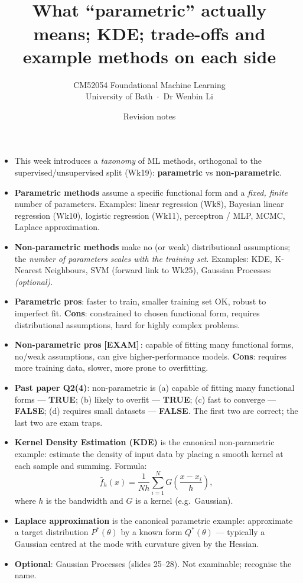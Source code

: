 \documentclass[11pt, a4paper]{article}
\title{\vspace{-1cm}{\Huge\bfseries Week 20 — Parametric \& Non-parametric Approximations} \\[0.4em]{\large What ``parametric'' actually means; KDE; trade-offs and example methods on each side}}
\author{\large CM52054 Foundational Machine Learning \\[0.2em]\normalsize University of Bath \,$\cdot$\, Dr Wenbin Li}
\date{Revision notes}
\newcommand{\examflag}{\textcolor{tipBd}{\textbf{[EXAM]}}\,}
\begin{document}
\maketitle\thispagestyle{empty}\vspace{1em}

\begin{tldrbox}
\begin{itemize}[leftmargin=*]
  \item This week introduces a \emph{taxonomy} of ML methods, orthogonal to the supervised/unsupervised split (Wk19): \textbf{parametric} vs \textbf{non-parametric}.
  \item \textbf{Parametric methods} assume a specific functional form and a \emph{fixed, finite} number of parameters. Examples: linear regression (Wk8), Bayesian linear regression (Wk10), logistic regression (Wk11), perceptron / MLP, MCMC, Laplace approximation.
  \item \textbf{Non-parametric methods} make no (or weak) distributional assumptions; the \emph{number of parameters scales with the training set}. Examples: KDE, K-Nearest Neighbours, SVM (forward link to Wk25), Gaussian Processes \emph{(optional)}.
  \item \textbf{Parametric pros}: faster to train, smaller training set OK, robust to imperfect fit. \textbf{Cons}: constrained to chosen functional form, requires distributional assumptions, hard for highly complex problems.
  \item \textbf{Non-parametric pros} \examflag{}: capable of fitting many functional forms, no/weak assumptions, can give higher-performance models. \textbf{Cons}: requires more training data, slower, more prone to overfitting.
  \item \textbf{Past paper Q2(4)}: non-parametric is (a) capable of fitting many functional forms — \textbf{TRUE}; (b) likely to overfit — \textbf{TRUE}; (c) fast to converge — \textbf{FALSE}; (d) requires small datasets — \textbf{FALSE}. The first two are correct; the last two are exam traps.
  \item \textbf{Kernel Density Estimation (KDE)} is the canonical non-parametric example: estimate the density of input data by placing a smooth kernel at each sample and summing. Formula:
  \[
  \bar f_h(x) = \frac{1}{Nh}\sum_{i=1}^N G\!\left(\frac{x-x_i}{h}\right),
  \]
  where $h$ is the bandwidth and $G$ is a kernel (e.g.\ Gaussian).
  \item \textbf{Laplace approximation} is the canonical parametric example: approximate a target distribution $P^*(\theta)$ by a known form $Q^*(\theta)$ — typically a Gaussian centred at the mode with curvature given by the Hessian.
  \item \textbf{Optional}: Gaussian Processes (slides 25--28). Not examinable; recognise the name.
\end{itemize}
\end{tldrbox}
\end{document}

